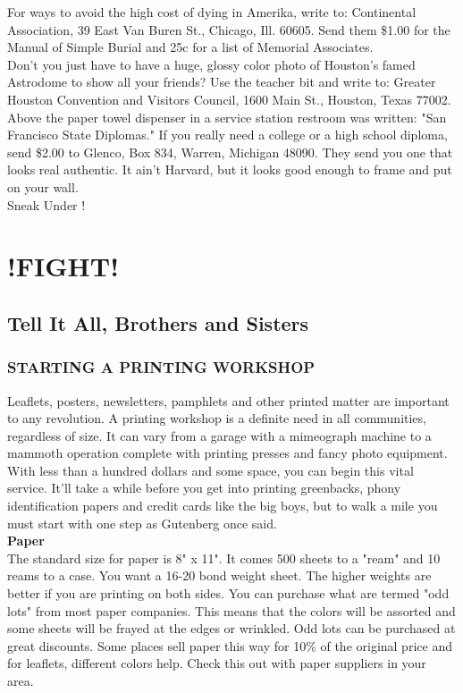 \documentclass[11pt,twoside,a4paper]{book}
\begin{document}
For ways to avoid the high cost of dying in Amerika, write to: Continental Association, 39 East Van Buren St., Chicago, Ill. 60605. Send them \$1.00 for the Manual of Simple Burial and 25c for a list of Memorial Associates.~\\

Don't you just have to have a huge, glossy color photo of Houston's famed Astrodome to show all your friends? Use the teacher bit and write to: Greater Houston Convention and Visitors Council, 1600 Main St., Houston, Texas 77002.~\\

Above the paper towel dispenser in a service station restroom was written: "San Francisco State Diplomas." If  you really need a college or a high school diploma, send \$2.00 to Glenco, Box 834, Warren, Michigan 48090. They send you one that looks real authentic. It ain't Harvard, but it looks good enough to frame and put on your wall.~\\

Sneak Under !



\clearpage

\chapter{!FIGHT!}

\section{Tell It All, Brothers and Sisters}

\subsection{STARTING A PRINTING WORKSHOP}

Leaflets, posters, newsletters, pamphlets and other printed matter are important to any revolution. A printing workshop is a definite need in all communities, regardless of size. It can vary from a garage with a mimeograph machine to a mammoth operation complete with printing presses and fancy photo equipment. With less than a hundred dollars and some space, you can begin this vital service. It'll take a while before you get into printing greenbacks, phony identification papers and credit cards like the big boys, but to walk a mile you must start with one step as Gutenberg once said.~\\

\textbf{Paper}~\\
The standard size for paper is 8" x 11". It comes 500 sheets to a "ream" and 10 reams to a case. You want a 16-20 bond weight sheet. The higher weights are better if you are printing on both sides. You can purchase what are termed "odd lots" from most paper companies. This means that the colors will be assorted and some sheets will be frayed at the edges or wrinkled. Odd lots can be purchased at great discounts. Some places sell paper this way for 10\% of the original price and for leaflets, different colors help. Check this out with paper suppliers in your area.~\\
\end{document}

